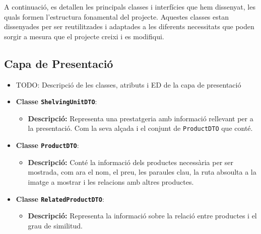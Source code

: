 \documentclass[a4paper,12pt]{report}
\begin{document}
A continuació, es detallen les principals classes i interfícies que hem dissenyat, les quals formen l'estructura fonamental del projecte. Aquestes classes estan dissenyades per ser reutilitzades i adaptades a les diferents necessitats que poden sorgir a mesura que el projecte creixi i es modifiqui. \\

\subsection{Capa de Presentació}
\begin{itemize}
	\item TODO: Descripció de les classes, atributs i ED de la capa de presentació
	\item \textbf{Classe \texttt{ShelvingUnitDTO}}:
	      \begin{itemize}
		      \item \textbf{Descripció:} Representa una prestatgeria amb informació rellevant per a la presentació. Com la seva alçada i el conjunt de \texttt{ProductDTO} que conté.
	      \end{itemize}
	\item \textbf{Classe \texttt{ProductDTO}}:
	      \begin{itemize}
		      \item \textbf{Descripció:} Conté la informació dels productes necessària per ser mostrada, com ara el nom, el preu, les paraules clau, la ruta absoulta a la imatge a mostrar i les relacions amb altres productes.
	      \end{itemize}
	\item \textbf{Classe \texttt{RelatedProductDTO}}:
	      \begin{itemize}
		      \item \textbf{Descripció:} Representa la informació sobre la relació entre productes i el grau de similitud.
	      \end{itemize}
\end{itemize}
\end{document}

